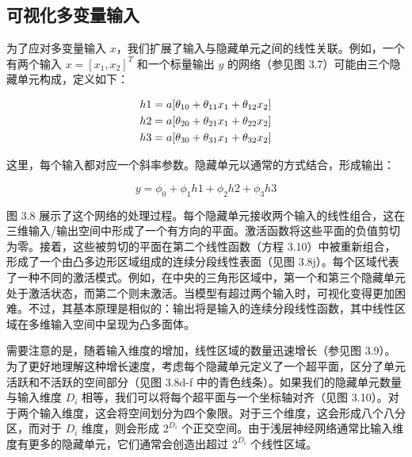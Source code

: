 \documentclass[lang=cn,newtx,10pt,scheme=chinese]{elegantbook}
\begin{document}
\subsection{可视化多变量输入}

为了应对多变量输入 \(x\)，我们扩展了输入与隐藏单元之间的线性关联。例如，一个有两个输入 \(x = [x_1, x_2]^T\) 和一个标量输出 \(y\) 的网络（参见图 3.7）可能由三个隐藏单元构成，定义如下：


\begin{align}
	h1 = a[\theta_{10} + \theta_{11}x_1 + \theta_{12}x_2] \notag \\
	h2 = a[\theta_{20} + \theta_{21}x_1 + \theta_{22}x_2] \notag \\
	h3 = a[\theta_{30} + \theta_{31}x_1 + \theta_{32}x_2] 
\end{align} 



这里，每个输入都对应一个斜率参数。隐藏单元以通常的方式结合，形成输出：

\begin{equation}
y = \phi_0 + \phi_1h1 + \phi_2h2 + \phi_3h3 
\end{equation}


图 3.8 展示了这个网络的处理过程。每个隐藏单元接收两个输入的线性组合，这在三维输入/输出空间中形成了一个有方向的平面。激活函数将这些平面的负值剪切为零。接着，这些被剪切的平面在第二个线性函数（方程 3.10）中被重新组合，形成了一个由凸多边形区域组成的连续分段线性表面（见图 3.8j）。每个区域代表了一种不同的激活模式。例如，在中央的三角形区域中，第一个和第三个隐藏单元处于激活状态，而第二个则未激活。当模型有超过两个输入时，可视化变得更加困难。不过，其基本原理是相似的：输出将是输入的连续分段线性函数，其中线性区域在多维输入空间中呈现为凸多面体。

需要注意的是，随着输入维度的增加，线性区域的数量迅速增长（参见图 3.9）。为了更好地理解这种增长速度，考虑每个隐藏单元定义了一个超平面，区分了单元活跃和不活跃的空间部分（见图 3.8d-f 中的青色线条）。如果我们的隐藏单元数量与输入维度 \(D_i\) 相等，我们可以将每个超平面与一个坐标轴对齐（见图 3.10）。对于两个输入维度，这会将空间划分为四个象限。对于三个维度，这会形成八个八分区，而对于 \(D_i\) 维度，则会形成 \(2^{D_i}\) 个正交空间。由于浅层神经网络通常比输入维度有更多的隐藏单元，它们通常会创造出超过 \(2^{D_i}\) 个线性区域。
\end{document}
